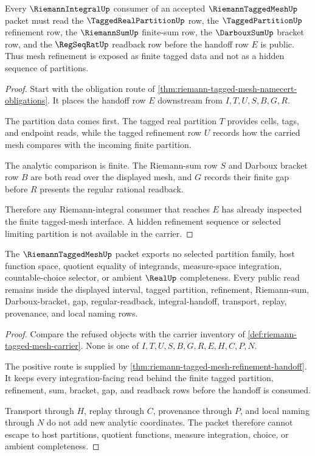 \begin{theorem}
\label{thm:riemann-tagged-mesh-refinement-handoff}
Every $\RiemannIntegralUp$ consumer of an accepted $\RiemannTaggedMeshUp$ packet must read the $\TaggedRealPartitionUp$ row, the $\TaggedPartitionUp$ refinement row, the $\RiemannSumUp$ finite-sum row, the $\DarbouxSumUp$ bracket row, and the $\RegSeqRatUp$ readback row before the handoff row $E$ is public. Thus mesh refinement is exposed as finite tagged data and not as a hidden sequence of partitions.
\end{theorem}
\begin{proof}
Start with the obligation route of \autoref{thm:riemann-tagged-mesh-namecert-obligations}. It places the handoff row $E$ downstream from $I,T,U,S,B,G,R$.

The partition data comes first. The tagged real partition $T$ provides cells, tags, and endpoint reads, while the tagged refinement row $U$ records how the carried mesh compares with the incoming finite partition.

The analytic comparison is finite. The Riemann-sum row $S$ and Darboux bracket row $B$ are both read over the displayed mesh, and $G$ records their finite gap before $R$ presents the regular rational readback.

Therefore any Riemann-integral consumer that reaches $E$ has already inspected the finite tagged-mesh interface. A hidden refinement sequence or selected limiting partition is not available in the carrier.
\end{proof}

\begin{theorem}
\label{thm:riemann-tagged-mesh-nonescape}
The $\RiemannTaggedMeshUp$ packet exports no selected partition family, host function space, quotient equality of integrands, measure-space integration, countable-choice selector, or ambient $\RealUp$ completeness. Every public read remains inside the displayed interval, tagged partition, refinement, Riemann-sum, Darboux-bracket, gap, regular-readback, integral-handoff, transport, replay, provenance, and local naming rows.
\end{theorem}
\begin{proof}
Compare the refused objects with the carrier inventory of \autoref{def:riemann-tagged-mesh-carrier}. None is one of $I,T,U,S,B,G,R,E,H,C,P,N$.

The positive route is supplied by \autoref{thm:riemann-tagged-mesh-refinement-handoff}. It keeps every integration-facing read behind the finite tagged partition, refinement, sum, bracket, gap, and readback rows before the handoff is consumed.

Transport through $H$, replay through $C$, provenance through $P$, and local naming through $N$ do not add new analytic coordinates. The packet therefore cannot escape to host partitions, quotient functions, measure integration, choice, or ambient completeness.
\end{proof}

